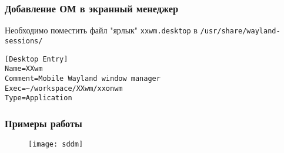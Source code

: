 \begin{frame}[fragile]
\frametitle{Добавление ОМ в экранный менеджер}

Необходимо поместить файл "ярлык" \texttt{xxwm.desktop} в \texttt{/usr/share/wayland-sessions/}
\begin{lstlisting}[style=crs_cpp]
[Desktop Entry]
Name=XXwm
Comment=Mobile Wayland window manager
Exec=~/workspace/XXwm/xxonwm
Type=Application
\end{lstlisting}

\end{frame}


\begin{frame}
\frametitle{Примеры работы}

\begin{figure}[h!]
\texttt{[image: sddm]}
\end{figure}

\end{frame}






